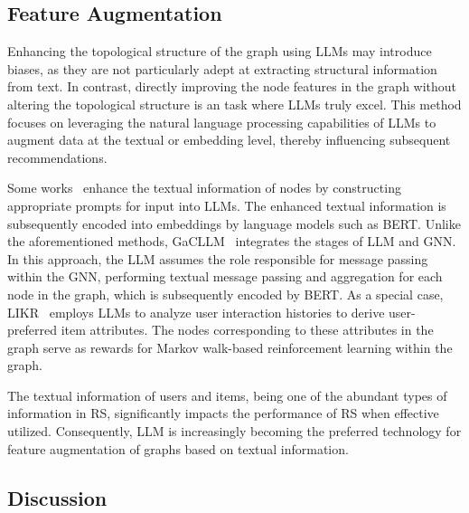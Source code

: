 \subsection{Feature Augmentation}
Enhancing the topological structure of the graph using LLMs may introduce biases, as they are not particularly adept at extracting structural information from text. In contrast, directly improving the node features in the graph without altering the topological structure is an task where LLMs truly excel.
This method focuses on leveraging the natural language processing capabilities of LLMs to augment data at the textual or embedding level, thereby influencing subsequent recommendations.

Some works~\cite{li2024learning,chen2024prompting} enhance the textual information of nodes by constructing appropriate prompts for input into LLMs. The enhanced textual information is subsequently encoded into embeddings by language models such as BERT. Unlike the aforementioned methods, GaCLLM~\cite{du2024large}  integrates the stages of LLM and GNN. In this approach, the LLM assumes the role responsible for message passing within the GNN, performing textual message passing and aggregation for each node in the graph, which is subsequently encoded by BERT. As a special case, LIKR~\cite{sakurai2024llm} employs LLMs to analyze user interaction histories to derive user-preferred item attributes. The nodes corresponding to these attributes in the graph serve as rewards for Markov walk-based reinforcement learning within the graph.

The textual information of users and items, being one of the abundant types of information in RS, significantly impacts the performance of RS when effective utilized. Consequently, LLM is increasingly becoming the preferred technology for feature augmentation of graphs based on textual information.

\subsection{Discussion}

